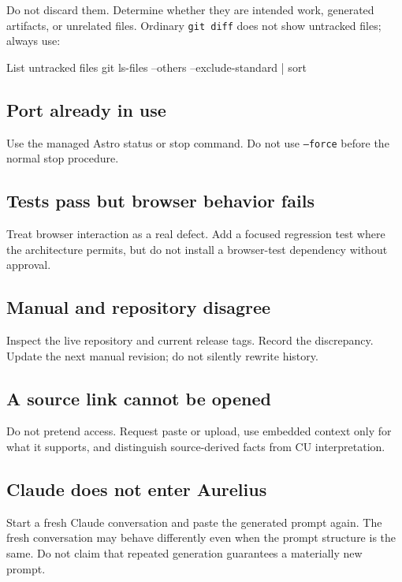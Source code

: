 \documentclass[11pt,letterpaper]{article}
\begin{document}
Do not discard them. Determine whether they are intended work, generated
artifacts, or unrelated files. Ordinary \texttt{git diff} does not show
untracked files; always use:

\begin{commandbox}{List untracked files}
git ls-files --others --exclude-standard | sort
\end{commandbox}

\subsection{Port already in use}

Use the managed Astro status or stop command. Do not use \texttt{--force}
before the normal stop procedure.

\subsection{Tests pass but browser behavior fails}

Treat browser interaction as a real defect. Add a focused regression test where
the architecture permits, but do not install a browser-test dependency without
approval.

\subsection{Manual and repository disagree}

Inspect the live repository and current release tags. Record the discrepancy.
Update the next manual revision; do not silently rewrite history.

\subsection{A source link cannot be opened}

Do not pretend access. Request paste or upload, use embedded context only for
what it supports, and distinguish source-derived facts from CU interpretation.

\subsection{Claude does not enter Aurelius}

Start a fresh Claude conversation and paste the generated prompt again. The
fresh conversation may behave differently even when the prompt structure is
the same. Do not claim that repeated generation guarantees a materially new
prompt.
\end{document}
